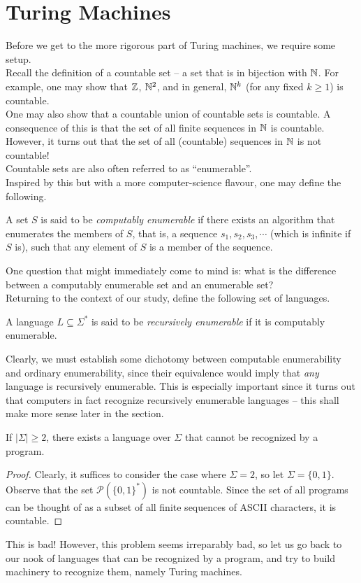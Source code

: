 \section{Turing Machines}


Before we get to the more rigorous part of Turing machines, we require some setup. \\
Recall the definition of a countable set -- a set that is in bijection with $\mathbb{N}$. For example, one may show that $\mathbb{Z}$, $\mathbb{N}^2$, and in general, $\mathbb{N}^k$ (for any fixed $k \ge 1$) is countable.\\
One may also show that a countable union of countable sets is countable. A consequence of this is that the set of all finite sequences in $\mathbb{N}$ is countable. However, it turns out that the set of all (countable) sequences in $\mathbb{N}$ is not countable!\\
Countable sets are also often referred to as ``enumerable''.\\

Inspired by this but with a more computer-science flavour, one may define the following.

\begin{fdef}
	A set $S$ is said to be \emph{computably enumerable} if there exists an algorithm that enumerates the members of $S$, that is, a sequence $s_1, s_2, s_3, \cdots$ (which is infinite if $S$ is), such that any element of $S$ is a member of the sequence.
\end{fdef}

One question that might immediately come to mind is: what is the difference between a computably enumerable set and an enumerable set? \\
Returning to the context of our study, define the following set of languages.

\begin{fdef}
	A language $L \subseteq \Sigma^*$ is said to be \emph{recursively enumerable} if it is computably enumerable.
\end{fdef}

Clearly, we must establish some dichotomy between computable enumerability and ordinary enumerability, since their equivalence would imply that \emph{any} language is recursively enumerable. This is especially important since it turns out that computers in fact recognize recursively enumerable languages -- this shall make more sense later in the section.

\begin{prop}
	If $|\Sigma|\ge 2$, there exists a language over $\Sigma$ that cannot be recognized by a program.
\end{prop}
\begin{proof}
	Clearly, it suffices to consider the case where $\Sigma = 2$, so let $\Sigma = \{0,1\}$. Observe that the set $\mathcal{P}(\{0,1\}^*)$ is not countable. Since the set of all programs can be thought of as a subset of all finite sequences of ASCII characters, it is countable.
\end{proof}
This is bad! However, this problem seems irreparably bad, so let us go back to our nook of languages that can be recognized by a program, and try to build machinery to recognize them, namely Turing machines.\\

